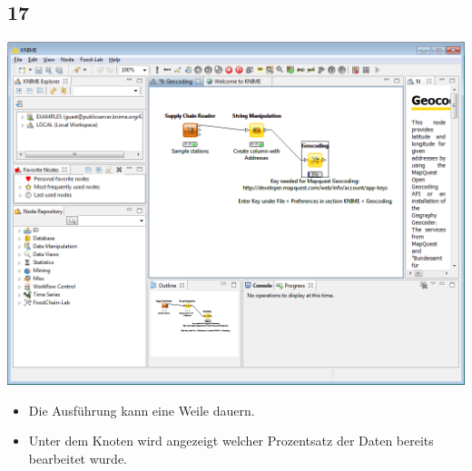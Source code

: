 \documentclass{beamer}
\begin{document}
\subsection{17}
\begin{frame}
	\begin{center}
  		\includegraphics[height=0.6\textheight]{17.png}
	\end{center}
	\begin{itemize}
		\item Die Ausführung kann eine Weile dauern.
		\item Unter dem Knoten wird angezeigt welcher Prozentsatz der Daten bereits bearbeitet wurde.
	\end{itemize}
\end{frame}
\end{document}
